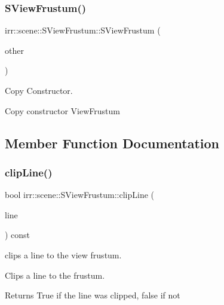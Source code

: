 \subsubsection{\texorpdfstring{S\+View\+Frustum()}{SViewFrustum()}}
{\footnotesize\ttfamily irr\+::scene\+::\+S\+View\+Frustum\+::\+S\+View\+Frustum (\begin{DoxyParamCaption}\item[{const \hyperlink{structirr_1_1scene_1_1SViewFrustum}{S\+View\+Frustum} \&}]{other }\end{DoxyParamCaption})\hspace{0.3cm}{\ttfamily [inline]}}



Copy Constructor. 

Copy constructor View\+Frustum 

\subsection{Member Function Documentation}
\mbox{\label{structirr_1_1scene_1_1SViewFrustum_a8d4a42afc55dde3b193ad0b1311f9dfe}} 
\subsubsection{\texorpdfstring{clip\+Line()}{clipLine()}}
{\footnotesize\ttfamily bool irr\+::scene\+::\+S\+View\+Frustum\+::clip\+Line (\begin{DoxyParamCaption}\item[{\hyperlink{classirr_1_1core_1_1line3d}{core\+::line3d}$<$ \hyperlink{namespaceirr_a0277be98d67dc26ff93b1a6a1d086b07}{f32} $>$ \&}]{line }\end{DoxyParamCaption}) const\hspace{0.3cm}{\ttfamily [inline]}}



clips a line to the view frustum. 

Clips a line to the frustum.

\begin{DoxyReturn}{Returns}
True if the line was clipped, false if not 
\end{DoxyReturn}
\mbox{\label{structirr_1_1scene_1_1SViewFrustum_acf8edd203e7479d2b444ed548075ffa6}} 
